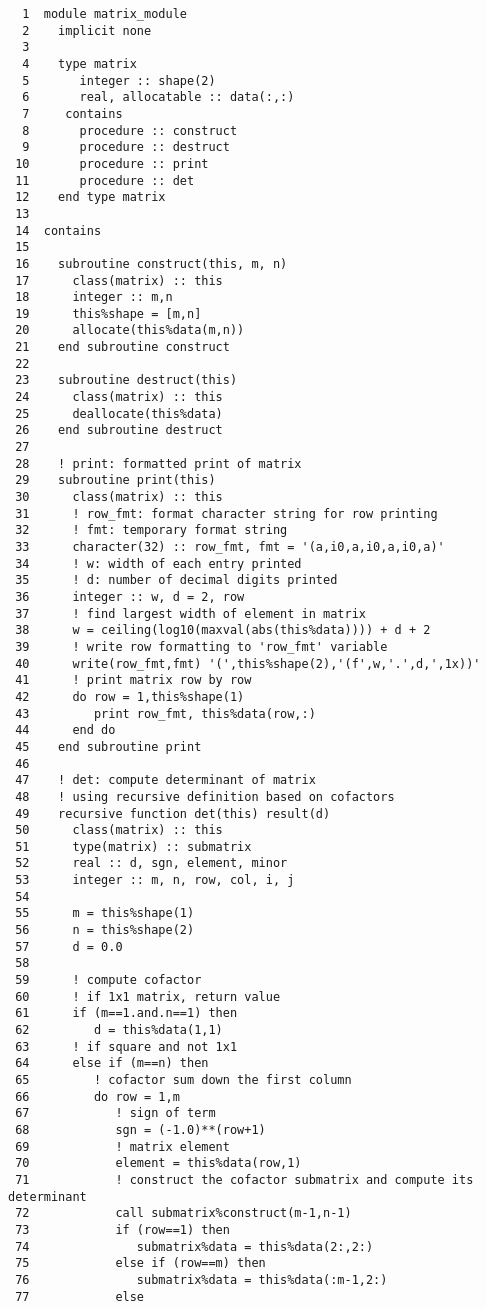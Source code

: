 \documentclass[11pt]{article}
\begin{document}
\begin{verbatim}
  1  module matrix_module
  2    implicit none
  3  
  4    type matrix
  5       integer :: shape(2)
  6       real, allocatable :: data(:,:)
  7     contains
  8       procedure :: construct
  9       procedure :: destruct
 10       procedure :: print
 11       procedure :: det
 12    end type matrix
 13  
 14  contains
 15  
 16    subroutine construct(this, m, n)
 17      class(matrix) :: this
 18      integer :: m,n
 19      this%shape = [m,n]
 20      allocate(this%data(m,n))
 21    end subroutine construct
 22  
 23    subroutine destruct(this)
 24      class(matrix) :: this
 25      deallocate(this%data)
 26    end subroutine destruct
 27  
 28    ! print: formatted print of matrix
 29    subroutine print(this)
 30      class(matrix) :: this
 31      ! row_fmt: format character string for row printing
 32      ! fmt: temporary format string
 33      character(32) :: row_fmt, fmt = '(a,i0,a,i0,a,i0,a)'
 34      ! w: width of each entry printed
 35      ! d: number of decimal digits printed
 36      integer :: w, d = 2, row
 37      ! find largest width of element in matrix
 38      w = ceiling(log10(maxval(abs(this%data)))) + d + 2
 39      ! write row formatting to 'row_fmt' variable
 40      write(row_fmt,fmt) '(',this%shape(2),'(f',w,'.',d,',1x))'
 41      ! print matrix row by row
 42      do row = 1,this%shape(1)
 43         print row_fmt, this%data(row,:)
 44      end do
 45    end subroutine print
 46  
 47    ! det: compute determinant of matrix
 48    ! using recursive definition based on cofactors
 49    recursive function det(this) result(d)
 50      class(matrix) :: this
 51      type(matrix) :: submatrix
 52      real :: d, sgn, element, minor
 53      integer :: m, n, row, col, i, j
 54  
 55      m = this%shape(1)
 56      n = this%shape(2)
 57      d = 0.0
 58  
 59      ! compute cofactor
 60      ! if 1x1 matrix, return value
 61      if (m==1.and.n==1) then
 62         d = this%data(1,1)
 63      ! if square and not 1x1
 64      else if (m==n) then
 65         ! cofactor sum down the first column
 66         do row = 1,m
 67            ! sign of term
 68            sgn = (-1.0)**(row+1)
 69            ! matrix element
 70            element = this%data(row,1)
 71            ! construct the cofactor submatrix and compute its determinant
 72            call submatrix%construct(m-1,n-1)
 73            if (row==1) then
 74               submatrix%data = this%data(2:,2:)
 75            else if (row==m) then
 76               submatrix%data = this%data(:m-1,2:)
 77            else

\end{verbatim}
\end{document}
